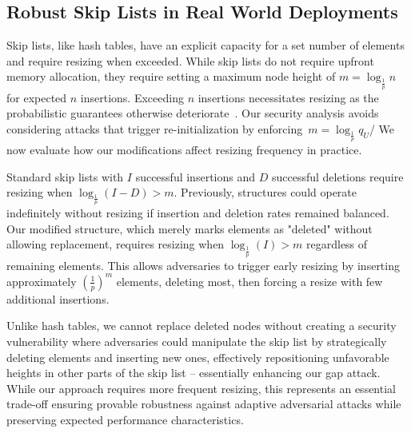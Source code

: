 \subsection{Robust Skip Lists in Real World Deployments}

Skip lists, like hash tables, have an explicit capacity for a set number of elements and require resizing when exceeded. While skip lists do not require upfront memory allocation, they require setting a maximum node height of $m=\log_{\frac{1}{p}} n$ for expected $n$ insertions. Exceeding $n$ insertions necessitates resizing as the probabilistic guarantees otherwise deteriorate~\cite{pugh}. Our security analysis avoids considering attacks that trigger re-initialization by enforcing~$m = \log_{\frac{1}{p}} q_U$/
We now evaluate how our modifications affect resizing frequency in practice.

Standard skip lists with $I$ successful insertions and $D$ successful deletions require resizing when $\log_{\frac{1}{p}} (I-D) > m$. Previously, structures could operate indefinitely without resizing if insertion and deletion rates remained balanced. Our modified structure, which merely marks elements as "deleted" without allowing replacement, requires resizing when $\log_{\frac{1}{p}} (I) > m$ regardless of remaining elements. This allows adversaries to trigger early resizing by inserting approximately $\left(\frac{1}{p}\right)^m$ elements, deleting most, then forcing a resize with few additional insertions.

Unlike hash tables, we cannot replace deleted nodes without creating a security vulnerability where adversaries could manipulate the skip list by strategically deleting elements and inserting new ones, effectively repositioning unfavorable heights in other parts of the skip list -- essentially enhancing our gap attack. While our approach requires more frequent resizing, this represents an essential trade-off ensuring provable robustness against adaptive adversarial attacks while preserving expected performance characteristics.
